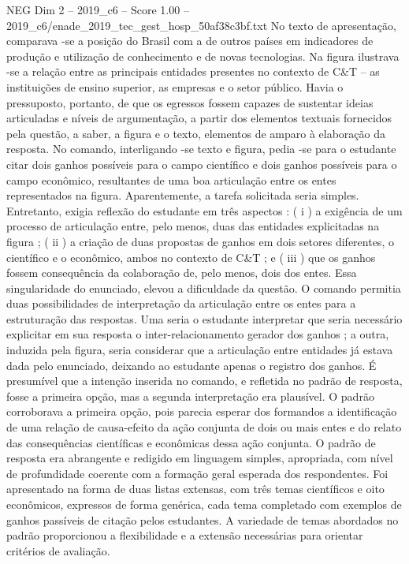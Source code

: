 \begin{textsample}{NEG Dim 2 – 2019\_c6 – Score 1.00 – 2019\_c6/enade\_2019\_tec\_gest\_hosp\_50af38c3bf.txt}
No texto de apresentação, comparava -se a posição do Brasil com a de outros países em indicadores de produção e utilização de conhecimento e de novas tecnologias.
Na figura ilustrava -se a relação entre as principais entidades presentes no contexto de C\&T – as instituições de ensino superior, as empresas e o setor público.
Havia o pressuposto, portanto, de que os egressos fossem capazes de sustentar ideias articuladas e níveis de argumentação, a partir dos elementos textuais fornecidos pela questão, a saber, a figura e o texto, elementos de amparo à elaboração da resposta.
No comando, interligando -se texto e figura, pedia -se para o estudante citar dois ganhos possíveis para o campo científico e dois ganhos possíveis para o campo econômico, resultantes de uma boa articulação entre os entes representados na figura.
Aparentemente, a tarefa solicitada seria simples.
Entretanto, exigia reflexão do estudante em três aspectos : ( i ) a exigência de um processo de articulação entre, pelo menos, duas das entidades explicitadas na figura ; ( ii ) a criação de duas propostas de ganhos em dois setores diferentes, o científico e o econômico, ambos no contexto de C\&T ; e ( iii ) que os ganhos fossem consequência da colaboração de, pelo menos, dois dos entes.
Essa singularidade do enunciado, elevou a dificuldade da questão.
O comando permitia duas possibilidades de interpretação da articulação entre os entes para a estruturação das respostas.
Uma seria o estudante interpretar que seria necessário explicitar em sua resposta o inter-relacionamento gerador dos ganhos ; a outra, induzida pela figura, seria considerar que a articulação entre entidades já estava dada pelo enunciado, deixando ao estudante apenas o registro dos ganhos.
É presumível que a intenção inserida no comando, e refletida no padrão de resposta, fosse a primeira opção, mas a segunda interpretação era plausível.
O padrão corroborava a primeira opção, pois parecia esperar dos formandos a identificação de uma relação de causa-efeito da ação conjunta de dois ou mais entes e do relato das consequências científicas e econômicas dessa ação conjunta.
O padrão de resposta era abrangente e redigido em linguagem simples, apropriada, com nível de profundidade coerente com a formação geral esperada dos respondentes.
Foi apresentado na forma de duas listas extensas, com três temas científicos e oito econômicos, expressos de forma genérica, cada tema completado com exemplos de ganhos passíveis de citação pelos estudantes.
A variedade de temas abordados no padrão proporcionou a flexibilidade e a extensão necessárias para orientar critérios de avaliação.

\end{textsample}
